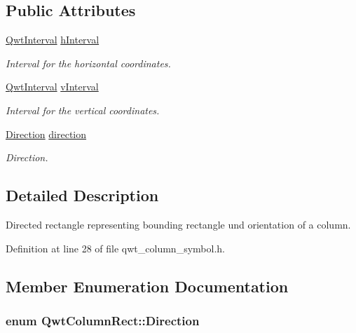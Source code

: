 \subsection*{Public Attributes}
\begin{DoxyCompactItemize}
\item 
\hyperlink{class_qwt_interval}{Qwt\-Interval} \hyperlink{class_qwt_column_rect_a16a24ece2aa70fc763d08e220608d63a}{h\-Interval}
\begin{DoxyCompactList}\small\item\em Interval for the horizontal coordinates. \end{DoxyCompactList}\item 
\hyperlink{class_qwt_interval}{Qwt\-Interval} \hyperlink{class_qwt_column_rect_a0dcd7826655c73da74a8f9ad87f3d62a}{v\-Interval}
\begin{DoxyCompactList}\small\item\em Interval for the vertical coordinates. \end{DoxyCompactList}\item 
\hyperlink{class_qwt_column_rect_a70bb2c6f1f8dabe3bc00793740e0908b}{Direction} \hyperlink{class_qwt_column_rect_aa630854df28955f2ee91c94524b079d7}{direction}
\begin{DoxyCompactList}\small\item\em Direction. \end{DoxyCompactList}\end{DoxyCompactItemize}


\subsection{Detailed Description}
Directed rectangle representing bounding rectangle und orientation of a column. 

Definition at line 28 of file qwt\-\_\-column\-\_\-symbol.\-h.



\subsection{Member Enumeration Documentation}
\hypertarget{class_qwt_column_rect_a70bb2c6f1f8dabe3bc00793740e0908b}{
\subsubsection[{Direction}]{\setlength{\rightskip}{0pt plus 5cm}enum {\bf Qwt\-Column\-Rect\-::\-Direction}}}\label{class_qwt_column_rect_a70bb2c6f1f8dabe3bc00793740e0908b}



